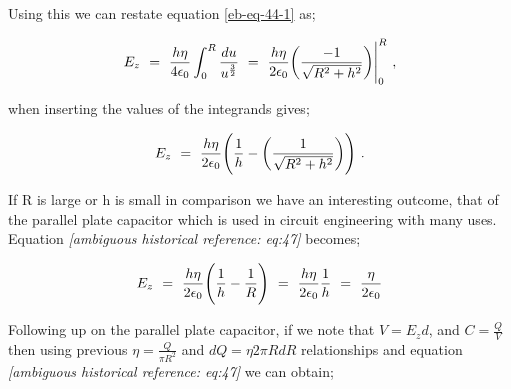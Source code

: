\documentclass{article}
\begin{document}
Using this we can restate equation \ref{eb-eq-44-1} as;

\begin{equation} \label{eb-eq-46-2}
E_{z} \hspace{0.125cm} = \hspace{0.125cm} \frac{h \eta }{4 \epsilon_{0}} \int_{0}^{R} \frac{du}{u^{\frac{3}{2}}} \hspace{0.125cm} = \hspace{0.125cm} \frac{h \eta }{2 \epsilon_{0}} \bigg( \frac{-1}{\sqrt{R^2 + h^2}} \bigg) \Bigg|_{0}^{R} \hspace{0.125cm} ,
\end{equation}

when inserting the values of the integrands gives;

\begin{equation} \label{eb-eq-47-2}
E_{z} \hspace{0.125cm} = \hspace{0.125cm} \frac{h \eta }{2 \epsilon_{0}} \Bigg( \frac{1}{h} - \bigg( \frac{1}{\sqrt{R^2 + h^2}} \bigg) \Bigg) \hspace{0.125cm} .
\end{equation}

If R is large or h is small in comparison we have an interesting outcome, that of the parallel plate capacitor which is used in circuit engineering with many uses. Equation \textit{[ambiguous historical reference: eq:47]} becomes;

\begin{equation} \label{eb-eq-48-1}
E_{z} \hspace{0.125cm} = \hspace{0.125cm} \frac{h \eta }{2 \epsilon_{0}} \Bigg( \frac{1}{h} - \frac{1}{R} \Bigg) \hspace{0.125cm} = \hspace{0.125cm} \frac{h \eta }{2 \epsilon_{0}} \frac{1}{h} \hspace{0.125cm} = \hspace{0.125cm} \frac{\eta }{2 \epsilon_{0}}
\end{equation}

Following up on the parallel plate capacitor, if we note that \begin{math} V = E_{z} d \end{math}, and \begin{math} C = \frac{Q}{V} \end{math} then using previous \begin{math} \eta = \frac{Q}{\pi R^{2}} \end{math} and \begin{math} dQ = \eta 2 \pi R dR \end{math} relationships and equation \textit{[ambiguous historical reference: eq:47]} we can obtain; 
\end{document}
